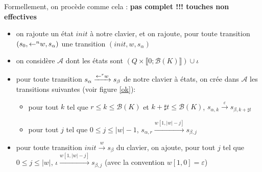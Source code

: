 \documentclass[12pt, a4paper]{article}
\newcommand{\A}{\mathcal{A}}
\begin{document}
    Formellement, on procède comme cela : \textbf{pas complet !!! touches non effectives}
    \begin{itemize}
        \item on rajoute un état $init$ à notre clavier, et on rajoute, pour toute transition $(s_0,\mathord{\leftarrow}^n w,s_{\alpha})$ une transition $(init,w,s_{\alpha})$
        \item on considère $\A$ dont les états sont  $( Q \times \llbracket 0 ; \mathcal{B}(K) \rrbracket ) \cup \iota$
        \item pour toute transition $s_{\alpha} \xrightarrow{\mathord{\leftarrow}^r w} s_{\beta}$ de notre clavier à états, on crée dans $\A$ les transitions suivantes (voir figure \ref{ok}):
            \begin{itemize}
                \item pour tout $k$ tel que $r \leqslant k \leqslant \mathcal{B}(K)$ et $k + \sharp t \leqslant \mathcal{B}(K)$, $s_{\alpha, k} \xrightarrow{\varepsilon} s_{\beta, k + \sharp t}$
                \item pour tout $j$ tel que $0 \leqslant j \leqslant |w| - 1$, $s_{\alpha, r} \xrightarrow{w[1,|w|-j]} s_{\beta, j}$
            \end{itemize} 
        \item pour toute transition $init \xrightarrow{w} s_{\beta}$ du clavier, on ajoute, pour tout $j$ tel que $0 \leqslant j \leqslant |w|$, $\iota \xrightarrow{w[1,|w|-j]} s_{\beta, j}$ (avec la convention $w[1,0] = \varepsilon$)   
    \end{itemize}
\end{document}
